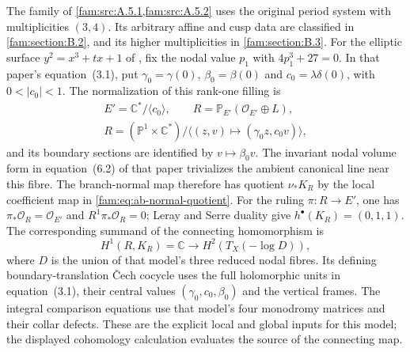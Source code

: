 \begin{remark}
\hypertarget{tag-IP09}{}\label{I:remark:rank-one-nodal-model}
The family of \cref{fam:src:A.5.1,fam:src:A.5.2} uses the original period
system with multiplicities $(3,4)$. Its arbitrary affine and cusp data are
classified in \cref{fam:section:B.2}, and its higher multiplicities in
\cref{fam:section:B.3}.
For the elliptic surface $y^2=x^3+tx+1$ of
\cite[Section~2, pp.~3--5; Proposition~3.1, pp.~6--7;
Proposition~6.1, pp.~17--18]{ViaclovskyTwo2026}, fix the nodal value
$p_1$ with $4p_1^3+27=0$. In that paper's equation~(3.1), put
$\gamma_0=\gamma(0)$, $\beta_0=\beta(0)$ and
$c_0=\lambda\delta(0)$, with $0<|c_0|<1$.
The normalization of this rank-one filling is
\[
 \begin{gathered}
 E'=\mathbb C^*/\langle c_0\rangle,\qquad
 R=\mathbb P_{E'}(\mathcal O_{E'}\oplus L),\\
 R=(\mathbb P^1\times\mathbb C^*)/
       \langle(z,v)\mapsto(\gamma_0z,c_0v)\rangle,
 \end{gathered}
\]
and its boundary sections are identified by $v\mapsto\beta_0v$.
The invariant nodal volume form in equation~(6.2) of that paper
trivializes the ambient canonical line near this fibre. The branch-normal
map therefore has quotient $\nu_*K_R$ by the local coefficient map in
\eqref{fam:eq:ab-normal-quotient}.
For the ruling $\pi:R\to E'$, one has
$\pi_*\mathcal O_R=\mathcal O_{E'}$ and
$R^1\pi_*\mathcal O_R=0$; Leray and Serre duality give
$h^\bullet(K_R)=(0,1,1)$.
The corresponding summand of the connecting homomorphism is
\[
 H^1(R,K_R)=\mathbb C\longrightarrow H^2(T_X(-\log D)),
\]
where $D$ is the union of that model's three reduced nodal fibres.
Its defining boundary-translation \v Cech cocycle uses the full
holomorphic units in equation~(3.1), their central values
$(\gamma_0,c_0,\beta_0)$ and the vertical frames. The integral
comparison equations use that model's four monodromy matrices and
their collar defects. These are the explicit local and global inputs
for this model; the displayed cohomology calculation evaluates the
source of the connecting map.
\end{remark}

